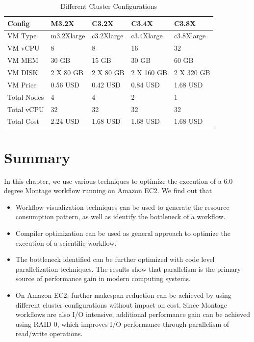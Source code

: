 \begin{table}[t!]
\caption{Different Cluster Configurations}
\label{tbl:cluster}
\centering
\begin{tabular}{|p{3.0cm}|p{3.0cm}|p{3.0cm}|p{3.0cm}|p{3.0cm}|}
\hline
Config & M3.2X & C3.2X & C3.4X& C3.8X\\ \hline
VM Type & m3.2Xlarge & c3.2Xlarge & c3.4Xlarge& c3.8Xlarge\\ \hline
VM vCPU & 8 & 8 & 16 & 32 \\ \hline
VM MEM & 30 GB & 15 GB & 30 GB & 60 GB \\ \hline
VM DISK & 2 X 80 GB & 2 X 80 GB & 2 X 160 GB & 2 X 320 GB \\ \hline
VM Price & 0.56 USD & 0.42 USD & 0.84 USD & 1.68 USD \\ \hline
Total Nodes & 4 & 4 & 2 & 1 \\ \hline
Total vCPU & 32 & 32 & 32 & 32 \\ \hline
Total Cost & 2.24 USD & 1.68 USD & 1.68 USD& 1.68 USD\\ \hline
\end{tabular}
\end{table}


\section{Summary}
\label{v1_sec:summary}

In this chapter, we use various techniques to optimize the execution of a 6.0 degree Montage workflow running on Amazon EC2. We find out that 

\begin{itemize}
	\item Workflow visualization techniques can be used to generate the resource consumption pattern, as well as identify the bottleneck of a workflow. 
	\item Compiler optimization can be used as general approach to optimize the execution of a scientific workflow. 
	\item The bottleneck identified can be further optimized with code level parallelization techniques. The results show that parallelism is the primary source of performance gain in modern computing systems.
	\item On Amazon EC2, further makespan reduction can be achieved by using different cluster configurations without impact on cost. Since Montage workflows are also I/O intensive, additional performance gain can be achieved using RAID 0, which improves I/O performance through parallelism of read/write operations.

\end{itemize}

